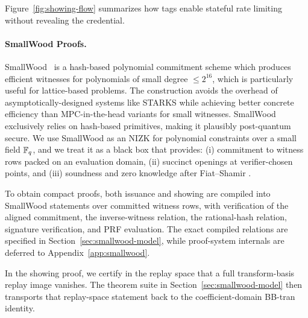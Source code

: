 Figure~\ref{fig:showing-flow} summarizes how tags enable stateful rate limiting without revealing the credential.

\paragraph{SmallWood Proofs.}

SmallWood~\cite{EPRINT:FenRiv25b} is a hash-based polynomial commitment scheme
which produces efficient witnesses for polynomials of small degree $\leq
2^{16}$, which is particularly useful for
lattice-based problems. The construction avoids the overhead of
asymptotically-designed systems like STARKS while achieving better concrete
efficiency than MPC-in-the-head variants for small witnesses. SmallWood exclusively relies on
hash-based primitives, making it plausibly post-quantum secure.
We use SmallWood as an
NIZK for polynomial constraints over a small field \(\mathbb{F}_q\), and we treat it as a black box that provides:
(i) commitment to witness rows packed on an evaluation domain, (ii) succinct openings at verifier-chosen points, and
(iii) soundness and zero knowledge after Fiat--Shamir \cite{EPRINT:FenRiv25b}.

To obtain compact proofs, both issuance and showing are compiled into SmallWood statements over committed
witness rows, with verification of the aligned commitment, the inverse-witness relation, the rational-hash relation,
signature verification, and PRF evaluation. The exact compiled relations are specified in
Section~\ref{sec:smallwood-model}, while proof-system internals are deferred to Appendix~\ref{app:smallwood}.

In the showing proof, we certify in the replay space that a full transform-basis replay image vanishes. The theorem
suite in Section~\ref{sec:smallwood-model} then transports that replay-space statement back to the coefficient-domain
BB-tran identity.
